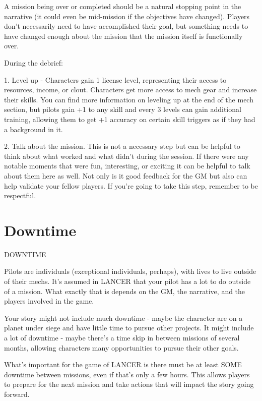 A mission being over or completed should be a natural stopping point in the narrative (it could  
even be mid-mission if the objectives have changed). Players don’t necessarily need to have  
accomplished their goal, but something needs to have changed enough about the mission that  
the mission itself is functionally over.
 

During the debrief:
 
	        1. Level up - Characters gain 1 license level, representing their access to resources,  
income, or clout. Characters get more access to mech gear and increase their skills. You can find  
more information on leveling up at the end of the mech section, but pilots gain +1 to any skill and  
every 3 levels can gain additional training, allowing them to get +1 accuracy on certain skill  
triggers as if they had a background in it.
 
	        2. Talk about the mission. This is not a necessary step but can be helpful to think about  
what worked and what didn’t during the session. If there were any notable moments that were  
fun, interesting, or exciting it can be helpful to talk about them here as well. Not only is it good  
feedback for the GM but also can help validate your fellow players. If you’re going to take this  
step, remember to be respectful.
 

\chapter{Downtime}
                                             DOWNTIME
 

Pilots are individuals (exceptional individuals, perhaps), with lives to live outside of their mechs.  
It’s assumed in LANCER that your pilot has a lot to do outside of a mission. What exactly that is  
depends on the GM, the narrative, and the players involved in the game. 
 

Your story might not include much downtime - maybe the character are on a planet under siege  
and have little time to pursue other projects. It might include a lot of downtime - maybe there’s a  
time skip in between missions of several months, allowing characters many opportunities to  
pursue their other goals.
 

What’s important for the game of LANCER is there must be at least SOME downtime between  
missions, even if that’s only a few hours. This allows players to prepare for the next mission and  
take actions that will impact the story going forward.
 

